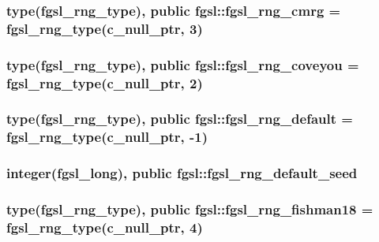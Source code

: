 \hypertarget{classfgsl_a46ec4ab895207c6e3da1a2adb29bb0ff}{
\subsubsection[{fgsl\-\_\-rng\-\_\-cmrg}]{\setlength{\rightskip}{0pt plus 5cm}type({\bf fgsl\-\_\-rng\-\_\-type}), public fgsl\-::fgsl\-\_\-rng\-\_\-cmrg = {\bf fgsl\-\_\-rng\-\_\-type}(c\-\_\-null\-\_\-ptr, 3)}}\label{classfgsl_a46ec4ab895207c6e3da1a2adb29bb0ff}
\hypertarget{classfgsl_a8eb316ba1f0e42680fb05bf4444f3018}{
\subsubsection[{fgsl\-\_\-rng\-\_\-coveyou}]{\setlength{\rightskip}{0pt plus 5cm}type({\bf fgsl\-\_\-rng\-\_\-type}), public fgsl\-::fgsl\-\_\-rng\-\_\-coveyou = {\bf fgsl\-\_\-rng\-\_\-type}(c\-\_\-null\-\_\-ptr, 2)}}\label{classfgsl_a8eb316ba1f0e42680fb05bf4444f3018}
\hypertarget{classfgsl_ab8c31f8079ad3a768a528cd525c8ccf2}{
\subsubsection[{fgsl\-\_\-rng\-\_\-default}]{\setlength{\rightskip}{0pt plus 5cm}type({\bf fgsl\-\_\-rng\-\_\-type}), public fgsl\-::fgsl\-\_\-rng\-\_\-default = {\bf fgsl\-\_\-rng\-\_\-type}(c\-\_\-null\-\_\-ptr, -\/1)}}\label{classfgsl_ab8c31f8079ad3a768a528cd525c8ccf2}
\hypertarget{classfgsl_a26af265921be65d7d401bd4865dfe221}{
\subsubsection[{fgsl\-\_\-rng\-\_\-default\-\_\-seed}]{\setlength{\rightskip}{0pt plus 5cm}integer({\bf fgsl\-\_\-long}), public fgsl\-::fgsl\-\_\-rng\-\_\-default\-\_\-seed}}\label{classfgsl_a26af265921be65d7d401bd4865dfe221}
\hypertarget{classfgsl_a8f22f1b0b7e5d37d485553834c96b959}{
\subsubsection[{fgsl\-\_\-rng\-\_\-fishman18}]{\setlength{\rightskip}{0pt plus 5cm}type({\bf fgsl\-\_\-rng\-\_\-type}), public fgsl\-::fgsl\-\_\-rng\-\_\-fishman18 = {\bf fgsl\-\_\-rng\-\_\-type}(c\-\_\-null\-\_\-ptr, 4)}}\label{classfgsl_a8f22f1b0b7e5d37d485553834c96b959}
